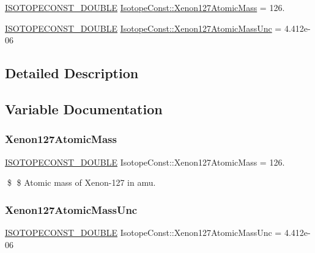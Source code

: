 \begin{DoxyCompactItemize}
\item 
\mbox{\hyperlink{group___isotope_const-_macros_ga8f45a7272ce02c0b4c65c44636ed719a}{I\+S\+O\+T\+O\+P\+E\+C\+O\+N\+S\+T\+\_\+\+D\+O\+U\+B\+LE}} \mbox{\hyperlink{group___isotope_const-_xenon-_xe127_ga416b1fdac8986017d251fa820931ea4f}{Isotope\+Const\+::\+Xenon127\+Atomic\+Mass}} = 126.
\item 
\mbox{\hyperlink{group___isotope_const-_macros_ga8f45a7272ce02c0b4c65c44636ed719a}{I\+S\+O\+T\+O\+P\+E\+C\+O\+N\+S\+T\+\_\+\+D\+O\+U\+B\+LE}} \mbox{\hyperlink{group___isotope_const-_xenon-_xe127_ga77f2c04e5c9f14e4f94cf4c25ff15e7c}{Isotope\+Const\+::\+Xenon127\+Atomic\+Mass\+Unc}} = 4.\+412e-\/06
\end{DoxyCompactItemize}


\subsection{Detailed Description}


\subsection{Variable Documentation}
\mbox{\label{group___isotope_const-_xenon-_xe127_ga416b1fdac8986017d251fa820931ea4f}} 
\subsubsection{\texorpdfstring{Xenon127\+Atomic\+Mass}{Xenon127AtomicMass}}
{\footnotesize\ttfamily \mbox{\hyperlink{group___isotope_const-_macros_ga8f45a7272ce02c0b4c65c44636ed719a}{I\+S\+O\+T\+O\+P\+E\+C\+O\+N\+S\+T\+\_\+\+D\+O\+U\+B\+LE}} Isotope\+Const\+::\+Xenon127\+Atomic\+Mass = 126.}

\$ \$ Atomic mass of Xenon-\/127 in amu. \mbox{\label{group___isotope_const-_xenon-_xe127_ga77f2c04e5c9f14e4f94cf4c25ff15e7c}} 
\subsubsection{\texorpdfstring{Xenon127\+Atomic\+Mass\+Unc}{Xenon127AtomicMassUnc}}
{\footnotesize\ttfamily \mbox{\hyperlink{group___isotope_const-_macros_ga8f45a7272ce02c0b4c65c44636ed719a}{I\+S\+O\+T\+O\+P\+E\+C\+O\+N\+S\+T\+\_\+\+D\+O\+U\+B\+LE}} Isotope\+Const\+::\+Xenon127\+Atomic\+Mass\+Unc = 4.\+412e-\/06}

